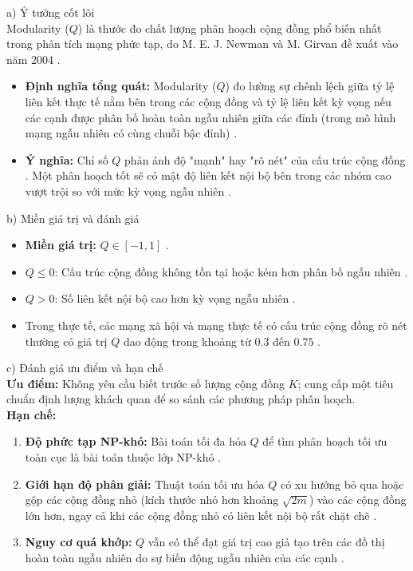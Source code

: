 \documentclass[14pt,a4paper]{extarticle}
\begin{document}
\noindent a) Ý tưởng cốt lõi
\\ \indent
Modularity ($Q$) là thước đo chất lượng phân hoạch cộng đồng phổ biến nhất trong phân tích mạng phức tạp, do M. E. J. Newman và M. Girvan đề xuất vào năm 2004 \cite{Chen2019}.
\begin{itemize}
    \item \textbf{Định nghĩa tổng quát:} Modularity ($Q$) đo lường sự chênh lệch giữa tỷ lệ liên kết thực tế nằm bên trong các cộng đồng và tỷ lệ liên kết kỳ vọng nếu các cạnh được phân bố hoàn toàn ngẫu nhiên giữa các đỉnh (trong mô hình mạng ngẫu nhiên có cùng chuỗi bậc đỉnh) \cite{Beldi2025}.
    \item \textbf{Ý nghĩa:} Chỉ số $Q$ phản ánh độ "mạnh" hay "rõ nét" của cấu trúc cộng đồng \cite{Newman2004, Beldi2025}. Một phân hoạch tốt sẽ có mật độ liên kết nội bộ bên trong các nhóm cao vượt trội so với mức kỳ vọng ngẫu nhiên \cite{Newman2004}.
\end{itemize}

\noindent b) Miền giá trị và đánh giá
\begin{itemize}
    \item \textbf{Miền giá trị:} $Q \in [-1, 1]$ \cite{Said2018, Beldi2025}.
    \item $Q \le 0$: Cấu trúc cộng đồng không tồn tại hoặc kém hơn phân bố ngẫu nhiên \cite{Baraa2021}.
    \item $Q > 0$: Số liên kết nội bộ cao hơn kỳ vọng ngẫu nhiên \cite{Newman2004, Baraa2021}.
    \item Trong thực tế, các mạng xã hội và mạng thực tế có cấu trúc cộng đồng rõ nét thường có giá trị $Q$ dao động trong khoảng từ $0.3$ đến $0.75$ \cite{Baraa2021}.
\end{itemize}

\noindent c) Đánh giá ưu điểm và hạn chế
\\ \indent
\textbf{Ưu điểm:} Không yêu cầu biết trước số lượng cộng đồng $K$; cung cấp một tiêu chuẩn định lượng khách quan để so sánh các phương pháp phân hoạch.
\\ \indent
\textbf{Hạn chế:}
\begin{enumerate}
    \item \textbf{Độ phức tạp NP-khó:} Bài toán tối đa hóa $Q$ để tìm phân hoạch tối ưu toàn cục là bài toán thuộc lớp NP-khó \cite{Said2018, Baraa2021}.
    \item \textbf{Giới hạn độ phân giải:} Thuật toán tối ưu hóa $Q$ có xu hướng bỏ qua hoặc gộp các cộng đồng nhỏ (kích thước nhỏ hơn khoảng $\sqrt{2m}$) vào các cộng đồng lớn hơn, ngay cả khi các cộng đồng nhỏ có liên kết nội bộ rất chặt chẽ \cite{Gong2016}.
    \item \textbf{Nguy cơ quá khớp:} $Q$ vẫn có thể đạt giá trị cao giả tạo trên các đồ thị hoàn toàn ngẫu nhiên do sự biến động ngẫu nhiên của các cạnh \cite{Gong2016}.
\end{enumerate}
\end{document}
